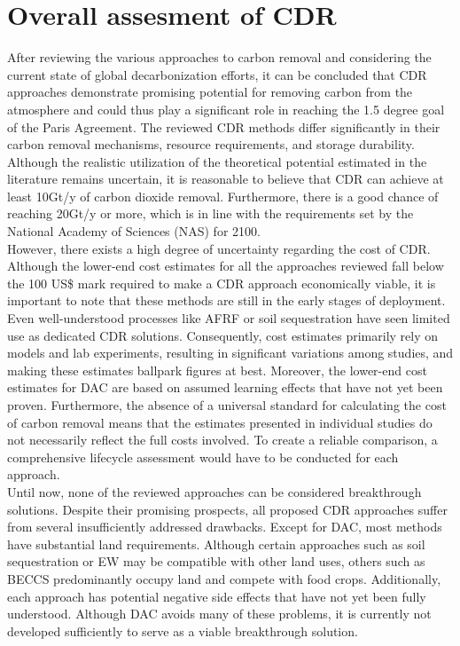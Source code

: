 \section{Overall assesment of CDR}
After reviewing the various approaches to carbon removal and considering the current state of global decarbonization efforts, it can be concluded that CDR approaches demonstrate promising potential for removing carbon from the atmosphere and could thus play a significant role in reaching the 1.5 degree goal of the Paris Agreement. The reviewed CDR methods differ significantly in their carbon removal mechanisms, resource requirements, and storage durability. Although the realistic utilization of the theoretical potential estimated in the literature remains uncertain, it is reasonable to believe that CDR can achieve at least 10Gt/y of carbon dioxide removal. Furthermore, there is a good chance of reaching 20Gt/y or more, which is in line with the requirements set by the National Academy of Sciences (NAS) for 2100.\\
However, there exists a high degree of uncertainty regarding the cost of CDR. Although the lower-end cost estimates for all the approaches reviewed fall below the 100 US\$ mark required to make a CDR approach economically viable, it is important to note that these methods are still in the early stages of deployment. Even well-understood processes like AFRF or soil sequestration have seen limited use as dedicated CDR solutions. Consequently, cost estimates primarily rely on models and lab experiments, resulting in significant variations among studies, and making these estimates ballpark figures at best. Moreover, the lower-end cost estimates for DAC are based on assumed learning effects that have not yet been proven. Furthermore, the absence of a universal standard for calculating the cost of carbon removal means that the estimates presented in individual studies do not necessarily reflect the full costs involved. To create a reliable comparison, a comprehensive lifecycle assessment would have to be conducted for each approach.\\
Until now, none of the reviewed approaches can be considered breakthrough solutions. Despite their promising prospects, all proposed CDR approaches suffer from several insufficiently addressed drawbacks. Except for DAC, most methods have substantial land requirements. Although certain approaches such as soil sequestration or EW may be compatible with other land uses, others such as BECCS predominantly occupy land and compete with food crops. Additionally, each approach has potential negative side effects that have not yet been fully understood. Although DAC avoids many of these problems, it is currently not developed sufficiently to serve as a viable breakthrough solution.\\
